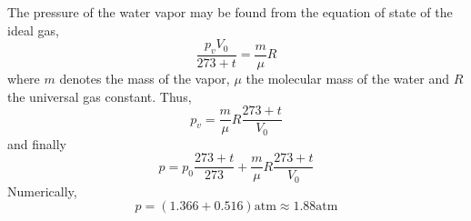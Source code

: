 \documentclass[12pt,a4paper]{book}
\begin{document}
	The pressure of the water vapor may be found from the equation of state of the ideal gas,
	\begin{equation*}
		\frac{p_vV_0}{273+t}=\frac{m}{\mu}R
	\end{equation*}
	where $m$ denotes the mass of the vapor, $\mu$ the molecular mass of the water and $R$ the universal gas constant. Thus,
	\begin{equation*}
		p_v=\frac{m}{\mu}R\frac{273+t}{V_0}
	\end{equation*}
	and f\mbox{}inally
	\begin{equation}
		p=p_0\frac{273+t}{273}+\frac{m}{\mu}R\frac{273+t}{V_0}
	\end{equation}
	Numerically,
	\begin{equation*}
		p=(1.366+0.516)\text{atm}\approx1.88\text{atm}
	\end{equation*}
\end{document}
